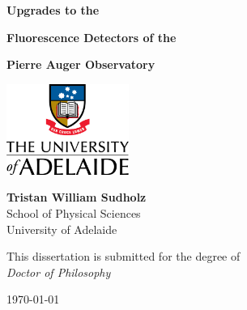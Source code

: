 \begin{titlepage}

\begin{center}

\textbf{\Huge Upgrades to the }

\vspace{3mm}

\textbf{\Huge Fluorescence Detectors of the}

\vspace{3mm}

\textbf{\Huge Pierre Auger Observatory} 

\vspace{3cm}

\includegraphics[width=0.3\textwidth]{pix/UoA_col_vert.png}

\vspace{3cm}


\textbf{\large Tristan William Sudholz} \\
\vspace{0.4cm}
\large School of Physical Sciences \\
\vspace{0.1cm}
\large University of Adelaide

\vspace{1.5cm}
\large This dissertation is submitted for the degree of \\
\vspace{0.2cm}
\textit{\large Doctor of Philosophy}
\vspace{2.5cm}

\monthyeardate\today

\end{center}

\end{titlepage}
